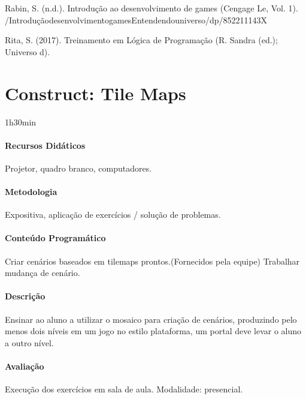 \documentclass[letterpaper,10pt,brazil]{sphinxmanual}
\begin{document}
\sphinxAtStartPar
Rabin, S. (n.d.). Introdução ao desenvolvimento de games (Cengage Le, Vol. 1).
/Introdução\sphinxhyphen{}desenvolvimento\sphinxhyphen{}games\sphinxhyphen{}Entendendo\sphinxhyphen{}universo/dp/852211143X

\sphinxAtStartPar
Rita, S. (2017). Treinamento em Lógica de Programação (R. Sandra (ed.); Universo d).

\sphinxstepscope


\chapter{Construct: Tile Maps}
\label{\detokenize{modelo_aula_09:construct-tile-maps}}\label{\detokenize{modelo_aula_09::doc}}
\sphinxAtStartPar
{} 1h30min
\subsubsection*{Recursos Didáticos}

\sphinxAtStartPar
Projetor, quadro branco, computadores.
\subsubsection*{Metodologia}

\sphinxAtStartPar
Expositiva, aplicação de exercícios / solução de problemas.
\subsubsection*{Conteúdo Programático}

\sphinxAtStartPar
Criar cenários baseados em tilemaps prontos.(Fornecidos pela equipe)
Trabalhar mudança de cenário.
\subsubsection*{Descrição}

\sphinxAtStartPar
Ensinar ao aluno a utilizar o mosaico para criação de cenários, produzindo pelo
menos dois níveis em um jogo no estilo plataforma, um portal deve levar o aluno a outro
nível.
\subsubsection*{Avaliação}

\sphinxAtStartPar
Execução dos exercícios em sala de aula.
Modalidade: presencial.
\end{document}
